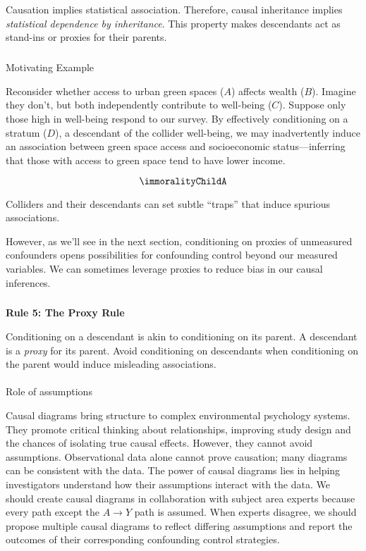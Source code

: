 \documentclass[
  singlecolumn]{article}
\makeatletter
\let\oldparagraph\paragraph
\renewcommand{\paragraph}{
    \@ifstar
      \xxxParagraphStar
      \xxxParagraphNoStar
  }
\newcommand{\xxxParagraphStar}[1]{\oldparagraph*{#1}\mbox{}}
\newcommand{\xxxParagraphNoStar}[1]{\oldparagraph{#1}\mbox{}}
\let\oldsubparagraph\subparagraph
\renewcommand{\subparagraph}{
    \@ifstar
      \xxxSubParagraphStar
      \xxxSubParagraphNoStar
  }
\newcommand{\xxxSubParagraphStar}[1]{\oldsubparagraph*{#1}\mbox{}}
\newcommand{\xxxSubParagraphNoStar}[1]{\oldsubparagraph{#1}\mbox{}}
\makeatother
\begin{document}
Causation implies statistical association. Therefore, causal inheritance
implies \emph{statistical dependence by inheritance}. This property
makes descendants act as stand-ins or proxies for their parents.

\subparagraph{Motivating Example}\label{motivating-example-4}

Reconsider whether access to urban green spaces (\(A\)) affects wealth
(\(B\)). Imagine they don't, but both independently contribute to
well-being (\(C\)). Suppose only those high in well-being respond to our
survey. By effectively conditioning on a stratum (\(D\)), a descendant
of the collider well-being, we may inadvertently induce an association
between green space access and socioeconomic status---inferring that
those with access to green space tend to have lower income.

\[
\immoralityChildA
\]

Colliders and their descendants can set subtle ``traps'' that induce
spurious associations.

However, as we'll see in the next section, conditioning on proxies of
unmeasured confounders opens possibilities for confounding control
beyond our measured variables. We can sometimes leverage proxies to
reduce bias in our causal inferences.

\subparagraph{\texorpdfstring{\textbf{Rule 5: The Proxy
Rule}}{Rule 5: The Proxy Rule}}\label{rule-5-the-proxy-rule}

Conditioning on a descendant is akin to conditioning on its parent. A
descendant is a \emph{proxy} for its parent. Avoid conditioning on
descendants when conditioning on the parent would induce misleading
associations.

\paragraph{Role of assumptions}\label{role-of-assumptions}

Causal diagrams bring structure to complex environmental psychology
systems. They promote critical thinking about relationships, improving
study design and the chances of isolating true causal effects. However,
they cannot avoid assumptions. Observational data alone cannot prove
causation; many diagrams can be consistent with the data. The power of
causal diagrams lies in helping investigators understand how their
assumptions interact with the data. We should create causal diagrams in
collaboration with subject area experts because every path except the
\(A \to Y\) path is assumed. When experts disagree, we should propose
multiple causal diagrams to reflect differing assumptions and report the
outcomes of their corresponding confounding control strategies.
\end{document}
